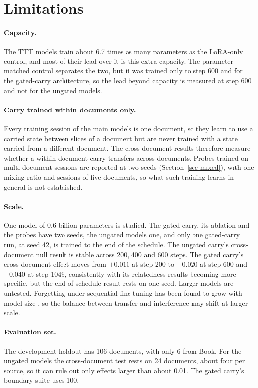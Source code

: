 \documentclass[12pt,a4paper]{report}
\begin{document}
\section{Limitations}
\label{sec-limits}

\paragraph{Capacity.} The TTT models train about 6.7 times as many parameters as the LoRA-only control, and most of their lead over it is this extra capacity. The parameter-matched control separates the two, but it was trained only to step 600 and for the gated-carry architecture, so the lead beyond capacity is measured at step 600 and not for the ungated models.

\paragraph{Carry trained within documents only.} Every training session of the main models is one document, so they learn to use a carried state between slices of a document but are never trained with a state carried from a different document. The cross-document results therefore measure whether a within-document carry transfers across documents. Probes trained on multi-document sessions are reported at two seeds (Section~\ref{sec-mixed}), with one mixing ratio and sessions of five documents, so what such training learns in general is not established.

\paragraph{Scale.} One model of 0.6 billion parameters is studied. The gated carry, its ablation and the probes have two seeds, the ungated models one, and only one gated-carry run, at seed 42, is trained to the end of the schedule. The ungated carry's cross-document null result is stable across 200, 400 and 600 steps. The gated carry's cross-document effect moves from $+0.010$ at step 200 to $-0.020$ at step 600 and $-0.040$ at step 1049, consistently with its relatedness results becoming more specific, but the end-of-schedule result rests on one seed. Larger models are untested. Forgetting under sequential fine-tuning has been found to grow with model size \citep{li2024revisiting}, so the balance between transfer and interference may shift at larger scale.

\paragraph{Evaluation set.} The development holdout has 106 documents, with only 6 from Book. For the ungated models the cross-document test rests on 24 documents, about four per source, so it can rule out only effects larger than about 0.01. The gated carry's boundary suite uses 100.
\end{document}
